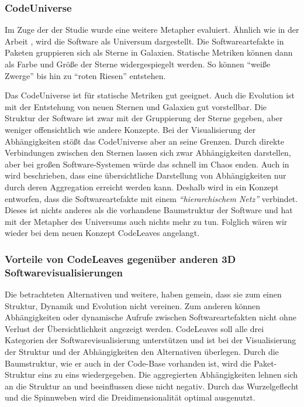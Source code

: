 \subsubsection*{CodeUniverse}

Im Zuge der der Studie \cite{puetz2017softwarevisualisierung} wurde eine weitere Metapher evaluiert. Ähnlich wie in der Arbeit \cite{graham2004solar, balzer2004software}, wird die Software als Universum dargestellt. Die Softwareartefakte in Paketen gruppieren sich als Sterne in Galaxien. Statische Metriken können dann als Farbe und Größe der Sterne widergespiegelt werden. So können "`weiße Zwerge"' bis hin zu "`roten Riesen"' entstehen.

Das CodeUniverse ist für statische Metriken gut geeignet. Auch die Evolution ist mit der Entstehung von neuen Sternen und Galaxien gut vorstellbar. Die Struktur der Software ist zwar mit der Gruppierung der Sterne gegeben, aber weniger offensichtlich wie andere Konzepte. Bei der Visualisierung der Abhängigkeiten stößt das CodeUniverse aber an seine Grenzen. Durch direkte Verbindungen zwischen den Sternen lassen sich zwar Abhängigkeiten darstellen, aber bei großen Software-Systemen würde das schnell im Chaos enden. Auch in \cite{balzer2004software} wird beschrieben, dass eine übersichtliche Darstellung von Abhängigkeiten nur durch deren Aggregation erreicht werden kann. Deshalb wird in \cite{balzer2004software} ein Konzept entworfen, dass die Softwareartefakte mit einem \emph{"`hierarchischem Netz"'} verbindet. Dieses ist nichts anderes als die vorhandene Baumstruktur der Software und hat mit der Metapher des Universums auch nichts mehr zu tun. Folglich wären wir wieder bei dem neuen Konzept CodeLeaves angelangt.


\subsubsection*{Vorteile von CodeLeaves gegenüber anderen 3D Softwarevisualisierungen}
Die betrachteten Alternativen und weitere, haben gemein, dass sie zum einen Struktur, Dynamik und Evolution nicht vereinen. Zum anderen können Abhängigkeiten oder dynamische Aufrufe zwischen Softwareartefakten nicht ohne Verlust der Übersichtlichkeit angezeigt werden. CodeLeaves soll alle drei Kategorien der Softwarevisualisierung unterstützen und ist bei der Visualisierung der Struktur und der Abhängigkeiten den Alternativen überlegen. Durch die Baumstruktur, wie er auch in der Code-Base vorhanden ist, wird die Paket-Struktur eins zu eins wiedergegeben. Die aggregierten Abhängigkeiten lehnen sich an die Struktur an und beeinflussen diese nicht negativ. Durch das Wurzelgeflecht und die Spinnweben wird die Dreidimensionalität optimal ausgenutzt.

